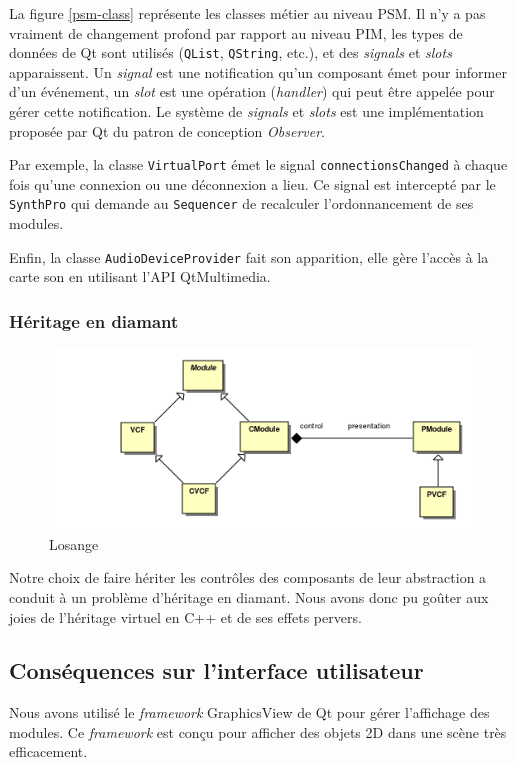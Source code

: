 La figure \ref{psm-class} représente les classes métier au niveau PSM. Il n'y a
pas vraiment de changement profond par rapport au niveau PIM, les
types de données de Qt sont utilisés (\verb!QList!, \verb!QString!,
etc.), et des \emph{signals} et \emph{slots} apparaissent. Un
\emph{signal} est une notification qu'un composant émet pour
informer d'un événement, un \emph{slot} est une opération
(\emph{handler}) qui peut être appelée pour gérer cette
notification. Le système de \emph{signals} et \emph{slots} est une
implémentation proposée par Qt du patron de conception
\emph{Observer}.

Par exemple, la classe \verb!VirtualPort! émet le signal
\verb!connectionsChanged! à chaque fois qu'une connexion ou une
déconnexion a lieu. Ce signal est intercepté par le \verb!SynthPro!
qui demande au \verb!Sequencer! de recalculer l'ordonnancement de
ses modules.

Enfin, la classe \verb!AudioDeviceProvider! fait son apparition,
elle gère l'accès à la carte son en utilisant l'API QtMultimedia.

\subsubsection{Héritage en diamant}

\begin{figure}[htb]
\centering
\includegraphics[width=17cm]{../img/ps/pacmodule-psm.pdf}
\caption{Losange}
\end{figure}

Notre choix de faire hériter les contrôles des composants de leur
abstraction a conduit à un problème d'héritage en diamant. Nous
avons donc pu goûter aux joies de l'héritage virtuel en C++ et de
ses effets pervers.

\subsection{Conséquences sur l'interface utilisateur}

Nous avons utilisé le \emph{framework} GraphicsView de Qt pour
gérer l'affichage des modules. Ce \emph{framework} est conçu pour
afficher des objets 2D dans une scène très efficacement.

